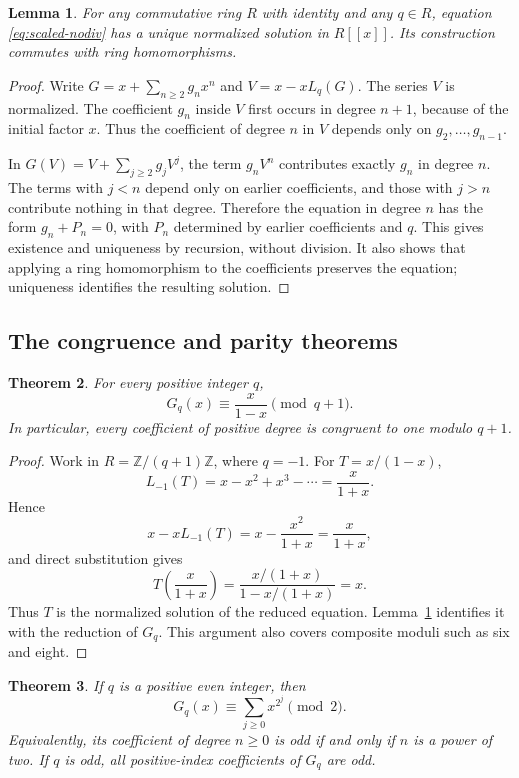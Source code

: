 \documentclass[11pt,a4paper]{article}
\newtheorem{theorem}{Theorem}[section]
\newtheorem{lemma}[theorem]{Lemma}
\theoremstyle{remark}\newtheorem{remark}[theorem]{Remark}
\newcommand{\Z}{\mathbb Z}
\begin{document}
\begin{lemma}\label{lem:scaled-unique}
For any commutative ring $R$ with identity and any $q\in R$, equation
\eqref{eq:scaled-nodiv} has a unique normalized solution in $R[[x]]$.
Its construction commutes with ring homomorphisms.
\end{lemma}

\begin{proof}
Write $G=x+\sum_{n\ge2}g_nx^n$ and
$V=x-xL_q(G)$. The series $V$ is normalized. The coefficient $g_n$
inside $V$ first occurs in degree $n+1$, because of the initial
factor $x$. Thus the coefficient of degree $n$ in $V$ depends
only on $g_2,\ldots,g_{n-1}$.

In $G(V)=V+\sum_{j\ge2}g_jV^j$, the term $g_nV^n$ contributes
exactly $g_n$ in degree $n$. The terms with $j<n$ depend only on
earlier coefficients, and those with $j>n$ contribute nothing in
that degree. Therefore the equation in degree $n$ has the form
$g_n+P_n=0$, with $P_n$ determined by earlier coefficients and $q$.
This gives existence and uniqueness by recursion, without division.
It also shows that applying a ring homomorphism to the coefficients
preserves the equation; uniqueness identifies the resulting solution.
\end{proof}

\subsection{The congruence and parity theorems}

\begin{theorem}\label{thm:scaled-congruence}
For every positive integer $q$,
\[
G_q(x)\equiv\frac{x}{1-x}\pmod{q+1}.
\]
In particular, every coefficient of positive degree is congruent to
one modulo $q+1$.
\end{theorem}

\begin{proof}
Work in $R=\Z/(q+1)\Z$, where $q=-1$. For $T=x/(1-x)$,
\[
L_{-1}(T)=x-x^2+x^3-\cdots=\frac{x}{1+x}.
\]
Hence
\[
x-xL_{-1}(T)=x-\frac{x^2}{1+x}=\frac{x}{1+x},
\]
and direct substitution gives
\[
T\left(\frac{x}{1+x}\right)
=\frac{x/(1+x)}{1-x/(1+x)}=x.
\]
Thus $T$ is the normalized solution of the reduced equation.
Lemma~\ref{lem:scaled-unique} identifies it with the reduction of
$G_q$. This argument also covers composite moduli such as six
and eight.
\end{proof}

\begin{theorem}\label{thm:scaled-parity}
If $q$ is a positive even integer, then
\[
G_q(x)\equiv\sum_{j\ge0}x^{2^j}\pmod2.
\]
Equivalently, its coefficient of degree $n\ge0$ is odd if and only
if $n$ is a power of two. If $q$ is odd, all positive-index
coefficients of $G_q$ are odd.
\end{theorem}
\end{document}
